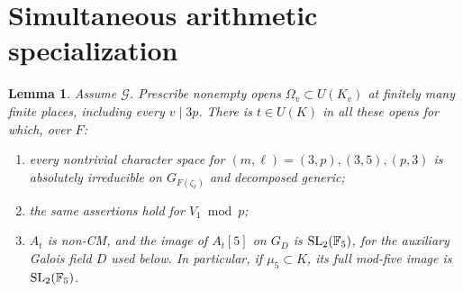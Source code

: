 \documentclass[11pt,a4paper]{article}
\newtheorem{lemma}[theorem]{Lemma}
\theoremstyle{definition}\newtheorem{definition}[theorem]{Definition}
\theoremstyle{remark}\newtheorem*{remark}{Remark}
\newcommand{\F}{\mathbb F}\newcommand{\OO}{\mathcal O}
\newcommand{\Ginput}{\mathcal G}
\begin{document}
\section{Simultaneous arithmetic specialization}\label{sec:specialization}

\begin{lemma}\label{lem:specialization}
Assume \(\Ginput\). Prescribe nonempty opens \(\Omega_v\subset U(K_v)\) at
finitely many finite places, including every \(v\mid3p\). There is
\(t\in U(K)\) in all these opens for which, over \(F\):
\begin{enumerate}
\item every nontrivial character space for
\((m,\ell)=(3,p),(3,5),(p,3)\) is absolutely irreducible on
\(G_{F(\zeta_\ell)}\) and decomposed generic;
\item the same assertions hold for \(V_1\bmod p\);
\item \(A_t\) is non-CM, and the image of \(A_t[5]\) on \(G_D\)
is \(\SL_2(\F_5)\), for the auxiliary Galois field \(D\) used below.
In particular, if \(\mu_5\subset K\), its full mod-five image is
\(\SL_2(\F_5)\).
\end{enumerate}
\end{lemma}
\end{document}
